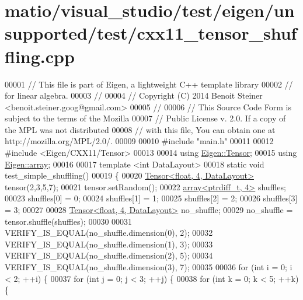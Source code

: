 \hypertarget{matio_2visual__studio_2test_2eigen_2unsupported_2test_2cxx11__tensor__shuffling_8cpp_source}{}\section{matio/visual\+\_\+studio/test/eigen/unsupported/test/cxx11\+\_\+tensor\+\_\+shuffling.cpp}
\label{matio_2visual__studio_2test_2eigen_2unsupported_2test_2cxx11__tensor__shuffling_8cpp_source}

\begin{DoxyCode}
00001 \textcolor{comment}{// This file is part of Eigen, a lightweight C++ template library}
00002 \textcolor{comment}{// for linear algebra.}
00003 \textcolor{comment}{//}
00004 \textcolor{comment}{// Copyright (C) 2014 Benoit Steiner <benoit.steiner.goog@gmail.com>}
00005 \textcolor{comment}{//}
00006 \textcolor{comment}{// This Source Code Form is subject to the terms of the Mozilla}
00007 \textcolor{comment}{// Public License v. 2.0. If a copy of the MPL was not distributed}
00008 \textcolor{comment}{// with this file, You can obtain one at http://mozilla.org/MPL/2.0/.}
00009 
00010 \textcolor{preprocessor}{#include "main.h"}
00011 
00012 \textcolor{preprocessor}{#include <Eigen/CXX11/Tensor>}
00013 
00014 \textcolor{keyword}{using} \hyperlink{class_eigen_1_1_tensor}{Eigen::Tensor};
00015 \textcolor{keyword}{using} \hyperlink{class_eigen_1_1array}{Eigen::array};
00016 
00017 \textcolor{keyword}{template} <\textcolor{keywordtype}{int} DataLayout>
00018 \textcolor{keyword}{static} \textcolor{keywordtype}{void} test\_simple\_shuffling()
00019 \{
00020   \hyperlink{class_eigen_1_1_tensor}{Tensor<float, 4, DataLayout>} tensor(2,3,5,7);
00021   tensor.setRandom();
00022   \hyperlink{class_eigen_1_1array}{array<ptrdiff\_t, 4>} shuffles;
00023   shuffles[0] = 0;
00024   shuffles[1] = 1;
00025   shuffles[2] = 2;
00026   shuffles[3] = 3;
00027 
00028   \hyperlink{class_eigen_1_1_tensor}{Tensor<float, 4, DataLayout>} no\_shuffle;
00029   no\_shuffle = tensor.shuffle(shuffles);
00030 
00031   VERIFY\_IS\_EQUAL(no\_shuffle.dimension(0), 2);
00032   VERIFY\_IS\_EQUAL(no\_shuffle.dimension(1), 3);
00033   VERIFY\_IS\_EQUAL(no\_shuffle.dimension(2), 5);
00034   VERIFY\_IS\_EQUAL(no\_shuffle.dimension(3), 7);
00035 
00036   \textcolor{keywordflow}{for} (\textcolor{keywordtype}{int} i = 0; i < 2; ++i) \{
00037     \textcolor{keywordflow}{for} (\textcolor{keywordtype}{int} j = 0; j < 3; ++j) \{
00038       \textcolor{keywordflow}{for} (\textcolor{keywordtype}{int} k = 0; k < 5; ++k) \{

\end{DoxyCode}
